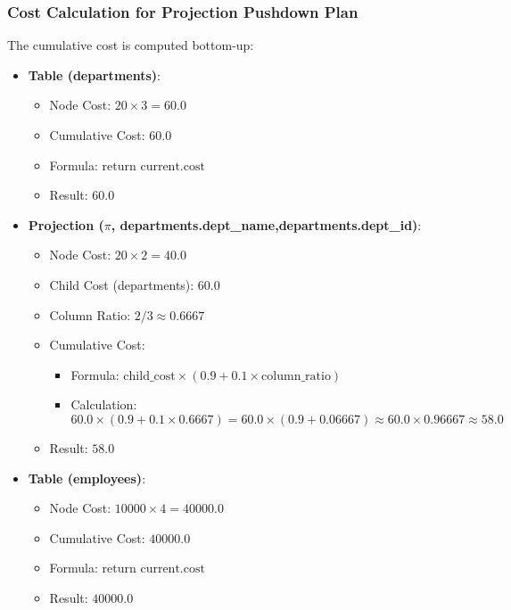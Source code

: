 \documentclass[12pt,a4paper]{article}
\begin{document}
\subsubsection{Cost Calculation for Projection Pushdown Plan}
The cumulative cost is computed bottom-up:

\begin{itemize}
    \item \textbf{Table (departments)}:
        \begin{itemize}
            \item Node Cost: $20 \times 3 = 60.0$
            \item Cumulative Cost: $60.0$
            \item Formula: $\text{return current.cost}$
            \item Result: $60.0$
        \end{itemize}
    \item \textbf{Projection ($\pi$, departments.dept\_name,departments.dept\_id)}:
        \begin{itemize}
            \item Node Cost: $20 \times 2 = 40.0$
            \item Child Cost (departments): $60.0$
            \item Column Ratio: $2 / 3 \approx 0.6667$
            \item Cumulative Cost:
                \begin{itemize}
                    \item Formula: $\text{child\_cost} \times (0.9 + 0.1 \times \text{column\_ratio})$
                    \item Calculation: $60.0 \times (0.9 + 0.1 \times 0.6667) = 60.0 \times (0.9 + 0.06667) \approx 60.0 \times 0.96667 \approx 58.0$
                \end{itemize}
            \item Result: $58.0$
        \end{itemize}
    \item \textbf{Table (employees)}:
        \begin{itemize}
            \item Node Cost: $10000 \times 4 = 40000.0$
            \item Cumulative Cost: $40000.0$
            \item Formula: $\text{return current.cost}$
            \item Result: $40000.0$
        \end{itemize}

\end{itemize}
\end{document}
